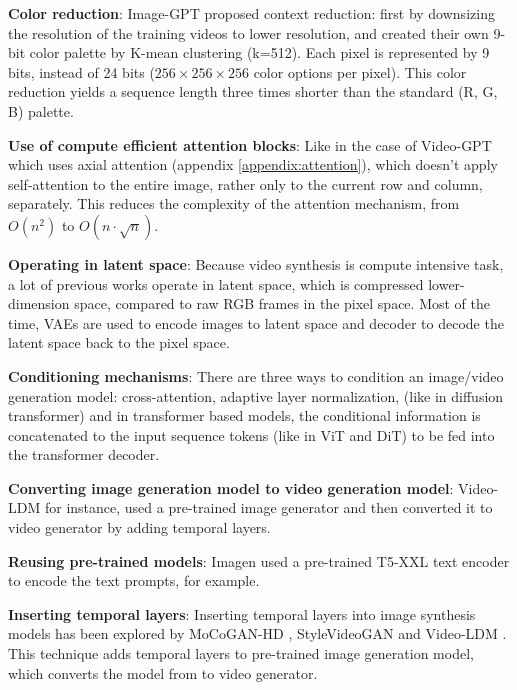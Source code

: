 \textbf{Color reduction}: Image-GPT \cite{imagegpt} proposed context reduction: first by downsizing the resolution of the training videos to lower resolution, and created their own 9-bit color palette by K-mean clustering (k=512). Each pixel is represented by 9 bits, instead of 24 bits ($256\times 256\times 256$ color options per pixel). This color reduction yields a sequence length three times shorter than the standard (R, G, B) palette.

\textbf{Use of compute efficient attention blocks}: Like in the case of Video-GPT \cite{videogpt} which uses axial attention (appendix \ref{appendix:attention}), which doesn't apply self-attention to the entire image, rather only to the current row and column, separately. This reduces the complexity of the attention mechanism, from $O(n^2)$ to $O(n \cdot \sqrt{n})$.

\textbf{Operating in latent space}: Because video synthesis is compute intensive task, a lot of previous works operate in latent space, which is compressed lower-dimension space, compared to raw RGB frames in the pixel space. Most of the time, VAEs are used to encode images to latent space and decoder to decode the latent space back to the pixel space.

\textbf{Conditioning mechanisms}: There are three ways to condition an image/video generation model: cross-attention, adaptive layer normalization, (like in diffusion transformer) and in transformer based models, the conditional information is concatenated to the input sequence tokens (like in ViT and DiT) to be fed into the transformer decoder.

\textbf{Converting image generation model to video generation model}: Video-LDM \cite{video_ldm} for instance, used a pre-trained image generator and then converted it to video generator by adding temporal layers.

\textbf{Reusing pre-trained models}: Imagen \cite{imagen} used a pre-trained T5-XXL text encoder to encode the text prompts, for example.

\textbf{Inserting temporal layers}: Inserting temporal layers into image synthesis models has been explored by MoCoGAN-HD \cite{mocogan_hd}, StyleVideoGAN \cite{style_video_gan} and Video-LDM \cite{video_ldm}. This technique adds temporal layers to pre-trained image generation model, which converts the model from to video generator.
